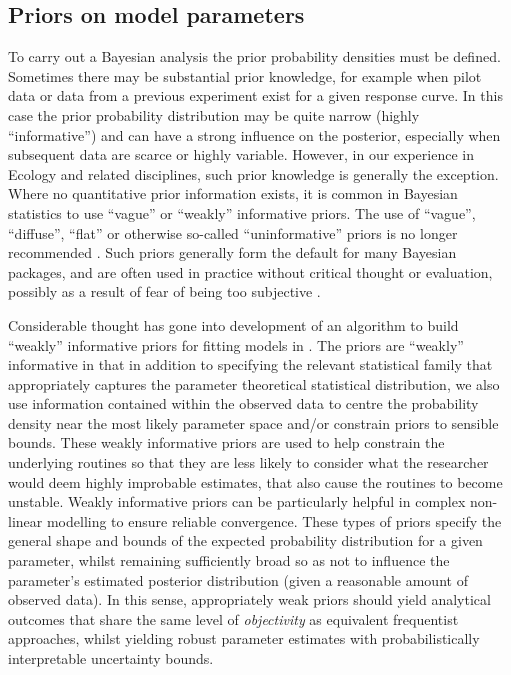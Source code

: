 \hypertarget{priors-on-model-parameters}{%
\subsection{Priors on model
parameters}\label{priors-on-model-parameters}}

To carry out a Bayesian analysis the prior probability densities must be
defined. Sometimes there may be substantial prior knowledge, for example
when pilot data or data from a previous experiment exist for a given
response curve. In this case the prior probability distribution may be
quite narrow (highly ``informative'') and can have a strong influence on
the posterior, especially when subsequent data are scarce or highly
variable. However, in our experience in Ecology and related disciplines,
such prior knowledge is generally the exception. Where no quantitative
prior information exists, it is common in Bayesian statistics to use
``vague'' or ``weakly'' informative priors. The use of ``vague'',
``diffuse'', ``flat'' or otherwise so-called ``uninformative'' priors is
no longer recommended \citep{Banner2020}. Such priors generally form the
default for many Bayesian packages, and are often used in practice
without critical thought or evaluation, possibly as a result of fear of
being too subjective \citep{Banner2020}.

Considerable thought has gone into development of an algorithm to build
``weakly'' informative priors for fitting models in . The
priors are ``weakly'' informative in that in addition to specifying the
relevant statistical family that appropriately captures the parameter
theoretical statistical distribution, we also use information contained
within the observed data to centre the probability density near the most
likely parameter space and/or constrain priors to sensible bounds. These
weakly informative priors are used to help constrain the underlying
routines so that they are less likely to consider what the researcher
would deem highly improbable estimates, that also cause the routines to
become unstable. Weakly informative priors can be particularly helpful
in complex non-linear modelling to ensure reliable convergence. These
types of priors specify the general shape and bounds of the expected
probability distribution for a given parameter, whilst remaining
sufficiently broad so as not to influence the parameter's estimated
posterior distribution (given a reasonable amount of observed data). In
this sense, appropriately weak priors should yield analytical outcomes
that share the same level of \emph{objectivity} as equivalent
frequentist approaches, whilst yielding robust parameter estimates with
probabilistically interpretable uncertainty bounds.

